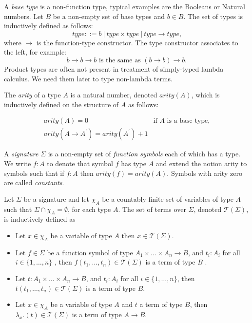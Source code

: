 \documentclass{article}
\begin{document}
A \emph{base type} is a non-function type, typical examples are the Booleans
or Natural numbers. Let $B$ be a non-empty set of base types and $b\in B$.
The set of types is inductively defined as follows:%
\begin{equation*}
type::=b\ |\ type\times type\ |\ type\rightarrow type\text{,}
\end{equation*}%
where $\rightarrow $ is the function-type constructor. The type constructor
associates to the left, for example:%
\begin{equation*}
b\rightarrow b\rightarrow b\text{ is the same as }(b\rightarrow
b)\rightarrow b\text{.}
\end{equation*}%
Product types are often not present in treatment of simply-typed lambda
calculus. We need them later to type non-lambda terms.

The \emph{arity} of a type $A$ is a natural number, denoted $arity(A)$,
which is inductively defined on the structure of $A$ as follows:

\begin{equation*}
\begin{array}{ll}
arity(A)=0 & \text{if }A\text{ is a base type,} \\ 
arity(A\rightarrow A^{\prime })=arity(A^{\prime })+1 & 
\end{array}%
\end{equation*}

A \emph{signature} $\Sigma $ is a non-empty set of \emph{function symbols}
each of which has a type. We write $f:A$ to denote that symbol $f$ has type $%
A$ and extend the notion arity to symbols such that if $f:A$ then $%
arity(f)=arity(A)$. Symbols with arity zero are called \emph{constants}.

Let $\Sigma $ be a signature and let $\chi _{A}$ be a countably finite set
of variables of type $A$ such that $\Sigma \cap \chi _{A}=\emptyset $, for
each type $A$. The set of terms over $\Sigma $, denoted $\mathcal{T}(\Sigma
) $, is inductively defined as

\begin{itemize}
\item Let $x\in \chi _{A}$ be a variable of type $A$ then $x\in \mathcal{T}%
(\Sigma )$.

\item Let $f\in \Sigma $ be a function symbol of type $A_{1}\times \ldots
\times A_{n}\rightarrow B$, and $t_{i}:A_{i}$ for all $i\in \{1,\ldots ,n\}$%
, then $f(t_{1},\ldots ,t_{n})\in \mathcal{T}(\Sigma )$ is a term of type $B$%
.

\item Let $t:A_{1}\times \ldots \times A_{n}\rightarrow B$, and $t_{i}:A_{i}$
for all $i\in \{1,\ldots ,n\}$, then $t(t_{1},\ldots ,t_{n})\in \mathcal{T}%
(\Sigma )$ is a term of type $B$.

\item Let $x\in \chi _{A}$ be a variable of type $A$ and $t$ a term of type $%
B$, then $\lambda _{x}.(t)\in \mathcal{T}(\Sigma )$ is a term of type $%
A\rightarrow B$.
\end{itemize}
\end{document}
